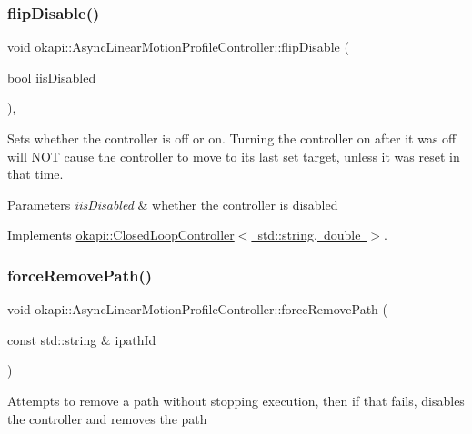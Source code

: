 \subsubsection{\texorpdfstring{flipDisable()}{flipDisable()}\hspace{0.1cm}{\footnotesize\ttfamily [2/2]}}
{\footnotesize\ttfamily void okapi\+::\+Async\+Linear\+Motion\+Profile\+Controller\+::flip\+Disable (\begin{DoxyParamCaption}\item[{bool}]{iis\+Disabled }\end{DoxyParamCaption})\hspace{0.3cm}{\ttfamily [override]}, {\ttfamily [virtual]}}

Sets whether the controller is off or on. Turning the controller on after it was off will N\+OT cause the controller to move to its last set target, unless it was reset in that time.


\begin{DoxyParams}{Parameters}
{\em iis\+Disabled} & whether the controller is disabled \\
\hline
\end{DoxyParams}


Implements \mbox{\hyperlink{classokapi_1_1ClosedLoopController_a768cd1db40ce9cd5c89b20be6e838ccc}{okapi\+::\+Closed\+Loop\+Controller$<$ std\+::string, double $>$}}.

\mbox{\label{classokapi_1_1AsyncLinearMotionProfileController_a59582a155943d96d5f6be9c06cfbf704}} 
\subsubsection{\texorpdfstring{forceRemovePath()}{forceRemovePath()}}
{\footnotesize\ttfamily void okapi\+::\+Async\+Linear\+Motion\+Profile\+Controller\+::force\+Remove\+Path (\begin{DoxyParamCaption}\item[{const std\+::string \&}]{ipath\+Id }\end{DoxyParamCaption})}

Attempts to remove a path without stopping execution, then if that fails, disables the controller and removes the path


